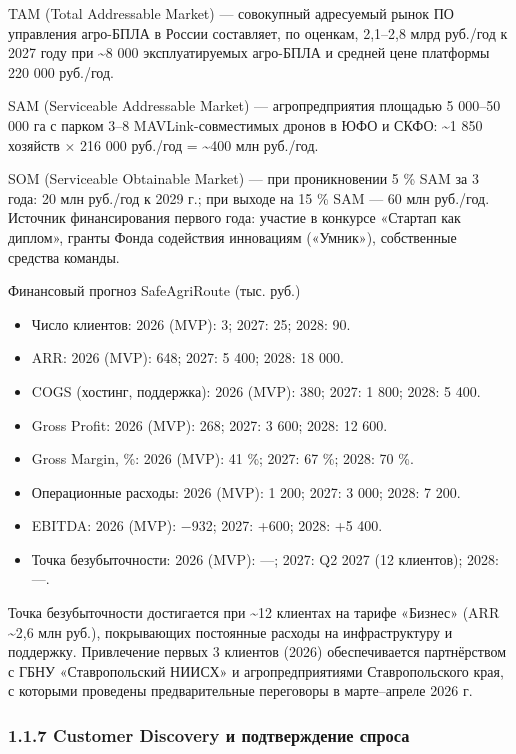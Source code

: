 \documentclass[14pt,a4paper]{extarticle}
\begin{document}
TAM (Total Addressable Market) --- совокупный адресуемый рынок ПО управления агро-БПЛА в России составляет, по оценкам, 2,1--2,8 млрд руб./год к 2027 году при \textasciitilde8 000 эксплуатируемых агро-БПЛА и средней цене платформы 220 000 руб./год.

SAM (Serviceable Addressable Market) --- агропредприятия площадью 5 000--50 000 га с парком 3--8 MAVLink-совместимых дронов в ЮФО и СКФО: \textasciitilde1 850 хозяйств × 216 000 руб./год = \textasciitilde400 млн руб./год.

SOM (Serviceable Obtainable Market) --- при проникновении 5 \% SAM за 3 года: 20 млн руб./год к 2029 г.; при выходе на 15 \% SAM --- 60 млн руб./год. Источник финансирования первого года: участие в конкурсе «Стартап как диплом», гранты Фонда содействия инновациям («Умник»), собственные средства команды.

Финансовый прогноз SafeAgriRoute (тыс. руб.)
\begin{itemize}
\item Число клиентов: 2026 (MVP): 3; 2027: 25; 2028: 90.
\item ARR: 2026 (MVP): 648; 2027: 5 400; 2028: 18 000.
\item COGS (хостинг, поддержка): 2026 (MVP): 380; 2027: 1 800; 2028: 5 400.
\item Gross Profit: 2026 (MVP): 268; 2027: 3 600; 2028: 12 600.
\item Gross Margin, \%: 2026 (MVP): 41 \%; 2027: 67 \%; 2028: 70 \%.
\item Операционные расходы: 2026 (MVP): 1 200; 2027: 3 000; 2028: 7 200.
\item EBITDA: 2026 (MVP): −932; 2027: +600; 2028: +5 400.
\item Точка безубыточности: 2026 (MVP): —; 2027: Q2 2027 (12 клиентов); 2028: —.
\end{itemize}


Точка безубыточности достигается при \textasciitilde12 клиентах на тарифе «Бизнес» (ARR \textasciitilde2,6 млн руб.), покрывающих постоянные расходы на инфраструктуру и поддержку. Привлечение первых 3 клиентов (2026) обеспечивается партнёрством с ГБНУ «Ставропольский НИИСХ» и агропредприятиями Ставропольского края, с которыми проведены предварительные переговоры в марте--апреле 2026 г.

\hypertarget{customer-discovery-ux438-ux43fux43eux434ux442ux432ux435ux440ux436ux434ux435ux43dux438ux435-ux441ux43fux440ux43eux441ux430}{%
\subsubsection{1.1.7 Customer Discovery и подтверждение спроса}\label{customer-discovery-ux438-ux43fux43eux434ux442ux432ux435ux440ux436ux434ux435ux43dux438ux435-ux441ux43fux440ux43eux441ux430}}
\end{document}
